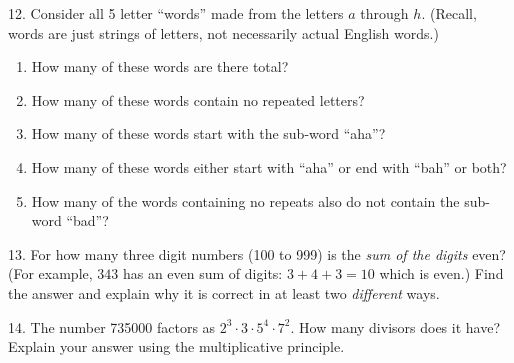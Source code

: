 \documentclass[10pt,]{book}
\theoremstyle{plain}
\theoremstyle{definition}
\theoremstyle{definition}
\theoremstyle{definition}
\theoremstyle{definition}
\numberwithin{equation}{chapter}
\begin{document}
\begin{exerciselist}
\begin{enumerate}[label=(\alph*)]
\end{enumerate}
%
\par\smallskip
\item[12.]\hypertarget{exercise-95}{}\hypertarget{p-776}{}%
Consider all 5 letter ``words'' made from the letters \(a\) through \(h\). (Recall, words are just strings of letters, not necessarily actual English words.) \leavevmode%
\begin{enumerate}[label=(\alph*)]
\item\hypertarget{li-357}{}\hypertarget{p-777}{}%
How many of these words are there total?%
\item\hypertarget{li-358}{}\hypertarget{p-778}{}%
How many of these words contain no repeated letters?%
\item\hypertarget{li-359}{}\hypertarget{p-779}{}%
How many of these words start with the sub-word ``aha''?%
\item\hypertarget{li-360}{}\hypertarget{p-780}{}%
How many of these words either start with ``aha'' or end with ``bah'' or both?%
\item\hypertarget{li-361}{}\hypertarget{p-781}{}%
How many of the words containing no repeats also do not contain the sub-word ``bad''?%
\end{enumerate}
%
\par\smallskip
\item[13.]\hypertarget{exercise-96}{}\hypertarget{p-784}{}%
For how many three digit numbers (100 to 999) is the \emph{sum of the digits} even? (For example, \(343\) has an even sum of digits: \(3+4+3 = 10\) which is even.) Find the answer and explain why it is correct in at least two \emph{different} ways.%
\par\smallskip
\item[14.]\hypertarget{exercise-97}{}\hypertarget{p-785}{}%
The number 735000 factors as \(2^3 \cdot 3 \cdot 5^4 \cdot 7^2\). How many divisors does it have? Explain your answer using the multiplicative principle.%
\par\smallskip
\end{exerciselist}
\typeout{************************************************}
\typeout{************************************************}
\end{document}
